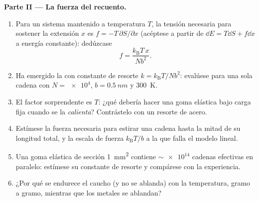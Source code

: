 \begin{problem}
\medskip\noindent\textbf{Parte II --- La fuerza del recuento.}
\begin{enumerate}[resume]
  \item Para un sistema mantenido a temperatura $T$, la tensión necesaria
        para sostener la extensión $x$ es $f = -T\,\partial S/\partial x$
        (acéptese a partir de $\dd E = T\dd S + f\dd x$ a energía
        constante): dedúzcase
        \[
        f = \frac{k_{\text{B}}T\,x}{Nb^2} .
        \]
  \item Ha emergido la  con constante de resorte $k =
        k_{\text{B}}T/Nb^2$: evalúese para una sola cadena con $N =
        \num{e4}$, $b = \qty{0.5}{nm}$ y \qty{300}{K}.
  \item El factor sorprendente es $T$: ¿qué debería hacer una goma
        elástica bajo carga fija cuando se la \emph{calienta}? Contrástelo
        con un resorte de acero.
  \item Estímese la fuerza necesaria para estirar una cadena hasta la mitad
        de su longitud total, y la escala de fuerza $k_{\text{B}}T/b$ a la
        que falla el modelo lineal.
  \item Una goma elástica de sección \qty{1}{mm^2} contiene
        $\sim\num{e14}$ cadenas efectivas en paralelo: estímese su
        constante de resorte y compárese con la experiencia.
  \item ¿Por qué se endurece el caucho (y no se ablanda) con la
        temperatura, gramo a gramo, mientras que los metales se ablandan?
\end{enumerate}


\end{problem}
